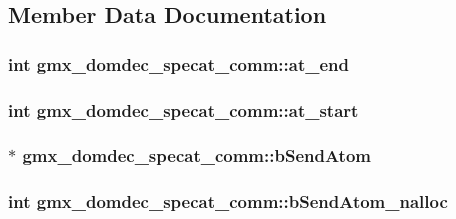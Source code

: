 \subsection{\-Member \-Data \-Documentation}
\hypertarget{structgmx__domdec__specat__comm_a631973322fcb25fde0d78baf789dad9f}{
\subsubsection[{at\-\_\-end}]{\setlength{\rightskip}{0pt plus 5cm}int {\bf gmx\-\_\-domdec\-\_\-specat\-\_\-comm\-::at\-\_\-end}}}\label{structgmx__domdec__specat__comm_a631973322fcb25fde0d78baf789dad9f}
\hypertarget{structgmx__domdec__specat__comm_ad3ec7ad7830e09ca80219763f79fd5d4}{
\subsubsection[{at\-\_\-start}]{\setlength{\rightskip}{0pt plus 5cm}int {\bf gmx\-\_\-domdec\-\_\-specat\-\_\-comm\-::at\-\_\-start}}}\label{structgmx__domdec__specat__comm_ad3ec7ad7830e09ca80219763f79fd5d4}
\hypertarget{structgmx__domdec__specat__comm_afc068510eeb667e940ebf0ead7c9a9b8}{
\subsubsection[{b\-Send\-Atom}]{$\ast$ {\bf gmx\-\_\-domdec\-\_\-specat\-\_\-comm\-::b\-Send\-Atom}}}\label{structgmx__domdec__specat__comm_afc068510eeb667e940ebf0ead7c9a9b8}
\hypertarget{structgmx__domdec__specat__comm_a9c50e541595f9128babf0263dfd29918}{
\subsubsection[{b\-Send\-Atom\-\_\-nalloc}]{\setlength{\rightskip}{0pt plus 5cm}int {\bf gmx\-\_\-domdec\-\_\-specat\-\_\-comm\-::b\-Send\-Atom\-\_\-nalloc}}}\label{structgmx__domdec__specat__comm_a9c50e541595f9128babf0263dfd29918}
